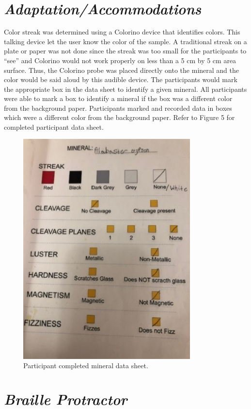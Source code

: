 \documentclass[11.5pt]{sig-alternate}
\begin{document}
\begin{large}
\section*{\textit{Adaptation/Accommodations}}
 Color streak was determined using a Colorino device that identifies colors. This talking device let the user know the color of the sample. A traditional streak on a plate or paper was not done since the streak was too small for the participants to “see” and Colorino would not work properly on less than a 5 cm by 5 cm area surface. Thus, the Colorino probe was placed directly onto the mineral and the color would be said aloud by this audible device. The participants would mark the appropriate box in the data sheet to identify a given mineral. All participants were able to mark a box to identify a mineral if the box was a different color from the background paper.  Participants marked and recorded data in boxes which were a different color from the background paper. Refer to Figure 5 for completed participant data sheet.
\begin{figure}[htp] 
  \renewcommand{\thefigure}{5}
    \centering
    \includegraphics[width=8 cm]{figure5.png}
    \caption{Participant completed mineral data sheet.}
    \label{Participant completed mineral data sheet. }
\end{figure}

\section*{\textit{Braille Protractor}}
 

\end{large}
\end{document}
